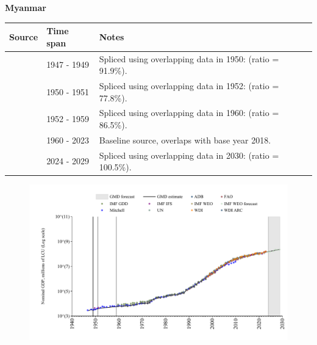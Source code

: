 \documentclass[12pt,a4paper,landscape]{article}
\begin{document}
\begin{adjustbox}{max totalsize={\paperwidth}{\paperheight},center}
\begin{minipage}[t][\textheight][t]{\textwidth}
\vspace*{0.5cm}
{}
\begin{center}
{\Large\bfseries Myanmar}
\end{center}
\vspace{0.5cm}
\begin{table}[H]
\centering
\small
\begin{tabular}{|l|l|l|}
\hline
\textbf{Source} & \textbf{Time span} & \textbf{Notes} \\
\hline
\rowcolor{white}\cite{Mitchell}& 1947 - 1949 &Spliced using overlapping data in 1950: (ratio = 91.9\%).\\
\rowcolor{lightgray}\cite{IMF_IFS}& 1950 - 1951 &Spliced using overlapping data in 1952: (ratio = 77.8\%).\\
\rowcolor{white}\cite{Mitchell}& 1952 - 1959 &Spliced using overlapping data in 1960: (ratio = 86.5\%).\\
\rowcolor{lightgray}\cite{WDI}& 1960 - 2023 &Baseline source, overlaps with base year 2018.\\
\rowcolor{white}\cite{IMF_WEO_forecast}& 2024 - 2029 &Spliced using overlapping data in 2030: (ratio = 100.5\%).\\
\hline
\end{tabular}
\end{table}
\begin{figure}[H]
\centering
\includegraphics[width=\textwidth,height=0.6\textheight,keepaspectratio]{graphs/MMR_nGDP.pdf}
\end{figure}
\end{minipage}
\end{adjustbox}
\end{document}
